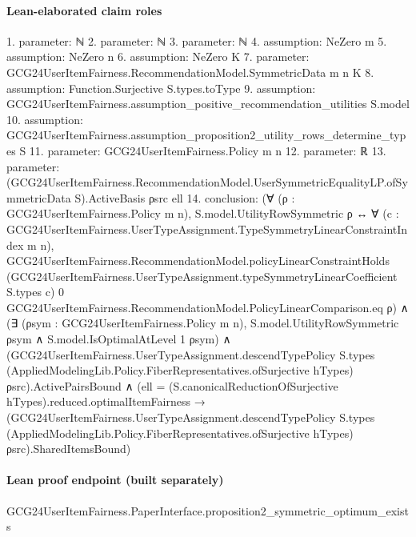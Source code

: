 \documentclass[10pt]{article}
\begin{document}
\paragraph{Lean-elaborated claim roles}\begin{ReviewVerbatim}
1. parameter: ℕ
2. parameter: ℕ
3. parameter: ℕ
4. assumption: NeZero m
5. assumption: NeZero n
6. assumption: NeZero K
7. parameter: GCG24UserItemFairness.RecommendationModel.SymmetricData m n K
8. assumption: Function.Surjective S.types.toType
9. assumption: GCG24UserItemFairness.assumption_positive_recommendation_utilities S.model
10. assumption: GCG24UserItemFairness.assumption_proposition2_utility_rows_determine_types S
11. parameter: GCG24UserItemFairness.Policy m n
12. parameter: ℝ
13. parameter: (GCG24UserItemFairness.RecommendationModel.UserSymmetricEqualityLP.ofSymmetricData S).ActiveBasis ρsrc ell
14. conclusion: (∀ (ρ : GCG24UserItemFairness.Policy m n),
    S.model.UtilityRowSymmetric ρ ↔
      ∀ (c : GCG24UserItemFairness.UserTypeAssignment.TypeSymmetryLinearConstraintIndex m n),
        GCG24UserItemFairness.RecommendationModel.policyLinearConstraintHolds
          (GCG24UserItemFairness.UserTypeAssignment.typeSymmetryLinearCoefficient S.types c) 0
          GCG24UserItemFairness.RecommendationModel.PolicyLinearComparison.eq ρ) ∧
  (∃ (ρsym : GCG24UserItemFairness.Policy m n), S.model.UtilityRowSymmetric ρsym ∧ S.model.IsOptimalAtLevel 1 ρsym) ∧
    (GCG24UserItemFairness.UserTypeAssignment.descendTypePolicy S.types
          (AppliedModelingLib.Policy.FiberRepresentatives.ofSurjective hTypes) ρsrc).ActivePairsBound ∧
      (ell = (S.canonicalReductionOfSurjective hTypes).reduced.optimalItemFairness →
        (GCG24UserItemFairness.UserTypeAssignment.descendTypePolicy S.types
            (AppliedModelingLib.Policy.FiberRepresentatives.ofSurjective hTypes) ρsrc).SharedItemsBound)
\end{ReviewVerbatim}

\paragraph{Lean proof endpoint (built separately)}\begin{ReviewVerbatim}
GCG24UserItemFairness.PaperInterface.proposition2_symmetric_optimum_exists
\end{ReviewVerbatim}
\end{document}
